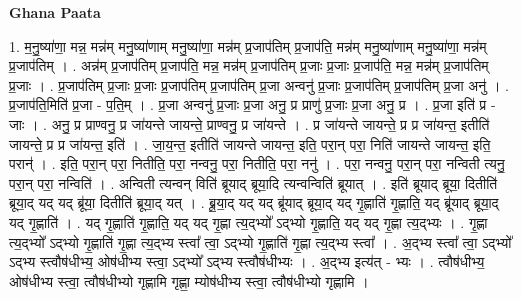 \documentclass[17pt]{extarticle}
\begin{document}
\textbf{Ghana Paata } \newline

1. म॒नु॒ष्या॑णा॒ मन्न॒ मन्न॑म् मनु॒ष्या॑णाम् मनु॒ष्या॑णा॒ मन्न॑म् प्र॒जाप॑तिम् प्र॒जाप॑ति॒ मन्न॑म् मनु॒ष्या॑णाम् मनु॒ष्या॑णा॒ मन्न॑म् प्र॒जाप॑तिम् । . अन्न॑म् प्र॒जाप॑तिम् प्र॒जाप॑ति॒ मन्न॒ मन्न॑म् प्र॒जाप॑तिम् प्र॒जाः प्र॒जाः प्र॒जाप॑ति॒ मन्न॒ मन्न॑म् प्र॒जाप॑तिम् प्र॒जाः । . प्र॒जाप॑तिम् प्र॒जाः प्र॒जाः प्र॒जाप॑तिम् प्र॒जाप॑तिम् प्र॒जा अन्वनु॑ प्र॒जाः प्र॒जाप॑तिम् प्र॒जाप॑तिम् प्र॒जा अनु॑ । . प्र॒जाप॑ति॒मिति॑ प्र॒जा - प॒ति॒म् । . प्र॒जा अन्वनु॑ प्र॒जाः प्र॒जा अनु॒ प्र प्राणु॑ प्र॒जाः प्र॒जा अनु॒ प्र । . प्र॒जा इति॑ प्र - जाः । . अनु॒ प्र प्राण्वनु॒ प्र जा॑यन्ते जायन्ते॒ प्राण्वनु॒ प्र जा॑यन्ते । . प्र जा॑यन्ते जायन्ते॒ प्र प्र जा॑यन्त॒ इतीति॑ जायन्ते॒ प्र प्र जा॑यन्त॒ इति॑ । . जा॒य॒न्त॒ इतीति॑ जायन्ते जायन्त॒ इति॒ परा॒न् परा॒ निति॑ जायन्ते जायन्त॒ इति॒ परान्॑ । . इति॒ परा॒न् परा॒ नितीति॒ परा॒ नन्वनु॒ परा॒ नितीति॒ परा॒ ननु॑ । . परा॒ नन्वनु॒ परा॒न् परा॒ नन्विती त्यनु॒ परा॒न् परा॒ नन्विति॑ । . अन्विती त्यन्वन् विति॑ ब्रूयाद् ब्रूया॒दि त्यन्वन्विति॑ ब्रूयात् । . इति॑ ब्रूयाद् ब्रूया॒ दितीति॑ ब्रूया॒द् यद् यद् ब्रू॑या॒ दितीति॑ ब्रूया॒द् यत् । . ब्रू॒या॒द् यद् यद् ब्रू॑याद् ब्रूया॒द् यद् गृ॒ह्णाति॑ गृ॒ह्णाति॒ यद् ब्रू॑याद् ब्रूया॒द् यद् गृ॒ह्णाति॑ । . यद् गृ॒ह्णाति॑ गृ॒ह्णाति॒ यद् यद् गृ॒ह्णा त्य॒द्भ्यो᳚ ऽद्भ्यो गृ॒ह्णाति॒ यद् यद् गृ॒ह्णा त्य॒द्भ्यः । . गृ॒ह्णा त्य॒द्भ्यो᳚ ऽद्भ्यो गृ॒ह्णाति॑ गृ॒ह्णा त्य॒द्भ्य स्त्वा᳚ त्वा॒ ऽद्भ्यो गृ॒ह्णाति॑ गृ॒ह्णा त्य॒द्भ्य स्त्वा᳚ । . अ॒द्भ्य स्त्वा᳚ त्वा॒ ऽद्भ्यो᳚ ऽद्भ्य स्त्वौष॑धीभ्य॒ ओष॑धीभ्य स्त्वा॒ ऽद्भ्यो᳚ ऽद्भ्य स्त्वौष॑धीभ्यः । . अ॒द्भ्य इत्य॑त् - भ्यः । . त्वौष॑धीभ्य॒ ओष॑धीभ्य स्त्वा॒ त्वौष॑धीभ्यो गृह्णामि गृह्णा॒ म्योष॑धीभ्य स्त्वा॒ त्वौष॑धीभ्यो गृह्णामि । \newline
\end{document}
